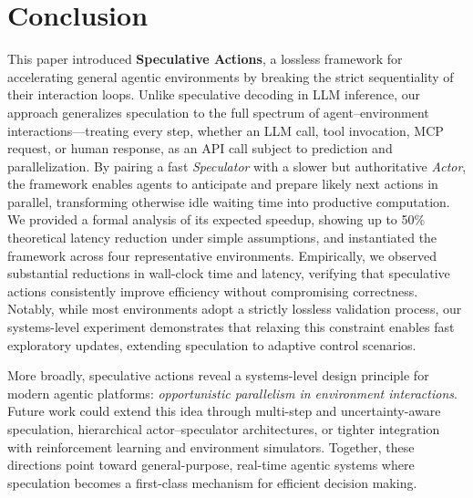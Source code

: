 \section{Conclusion}
\label{sec:conclusion}
This paper introduced \textbf{Speculative Actions}, a lossless framework for accelerating general agentic environments by breaking the strict sequentiality of their interaction loops. Unlike speculative decoding in LLM inference, our approach generalizes speculation to the full spectrum of agent–environment interactions—treating every step, whether an LLM call, tool invocation, MCP request, or human response, as an API call subject to prediction and parallelization. By pairing a fast \emph{Speculator} with a slower but authoritative \emph{Actor}, the framework enables agents to anticipate and prepare likely next actions in parallel, transforming otherwise idle waiting time into productive computation. We provided a formal analysis of its expected speedup, showing up to 50\% theoretical latency reduction under simple assumptions, and instantiated the framework across four representative environments. Empirically, we observed substantial reductions in wall-clock time and latency, verifying that speculative actions consistently improve efficiency without compromising correctness. Notably, while most environments adopt a strictly lossless validation process, our systems-level experiment demonstrates that relaxing this constraint enables fast exploratory updates, extending speculation to adaptive control scenarios.

More broadly, speculative actions reveal a systems-level design principle for modern agentic platforms: \emph{opportunistic parallelism in environment interactions}. Future work could extend this idea through multi-step and uncertainty-aware speculation, hierarchical actor–speculator architectures, or tighter integration with reinforcement learning and environment simulators. Together, these directions point toward general-purpose, real-time agentic systems where speculation becomes a first-class mechanism for efficient decision making.
